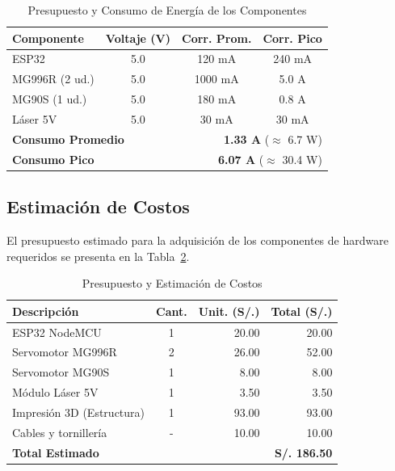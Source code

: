 \documentclass[conference,a4paper]{IEEEtran}
\newcommand{\tblsubhead}[1]{{\fontsize{7.5}{9}\selectfont #1}}
\begin{document}
\begin{table}[H]
\caption{Presupuesto y Consumo de Energía de los Componentes}
\begin{center}
\footnotesize
\begin{tabular}{l c c c}
\toprule
\textbf{Componente} & \textbf{Voltaje} \tblsubhead{(V)} & \textbf{Corr. Prom.} & \textbf{Corr. Pico} \\
\midrule
ESP32 & 5.0 & 120 mA & 240 mA \\
MG996R (2 ud.) & 5.0 & 1000 mA & 5.0 A \\
MG90S (1 ud.) & 5.0 & 180 mA & 0.8 A \\
Láser 5V & 5.0 & 30 mA & 30 mA \\
\midrule
\multicolumn{2}{l}{\textbf{Consumo Promedio}} & \multicolumn{2}{r}{\textbf{1.33 A} \tblsubhead{($\approx$ 6.7 W)}} \\
\multicolumn{2}{l}{\textbf{Consumo Pico}} & \multicolumn{2}{r}{\textbf{6.07 A} \tblsubhead{($\approx$ 30.4 W)}} \\
\bottomrule
\end{tabular}
\label{tab:energia}
\end{center}
\end{table}

\subsection{Estimación de Costos}
El presupuesto estimado para la adquisición de los componentes de hardware requeridos se presenta en la Tabla~\ref{tab:costos}.

\begin{table}[H]
\caption{Presupuesto y Estimación de Costos}
\begin{center}
\footnotesize
\begin{tabular}{l c r r}
\toprule
\textbf{Descripción} & \textbf{Cant.} & \textbf{Unit.} \tblsubhead{(S/.)} & \textbf{Total} \tblsubhead{(S/.)} \\
\midrule
ESP32 NodeMCU & 1 & 20.00 & 20.00 \\
Servomotor MG996R & 2 & 26.00 & 52.00 \\
Servomotor MG90S & 1 & 8.00 & 8.00 \\
Módulo Láser 5V & 1 & 3.50 & 3.50 \\
Impresión 3D (Estructura) & 1 & 93.00 & 93.00 \\
Cables y tornillería & - & 10.00 & 10.00 \\
\midrule
\multicolumn{3}{l}{\textbf{Total Estimado}} & \textbf{S/. 186.50} \\
\bottomrule
\end{tabular}
\label{tab:costos}
\end{center}
\end{table}
\end{document}
